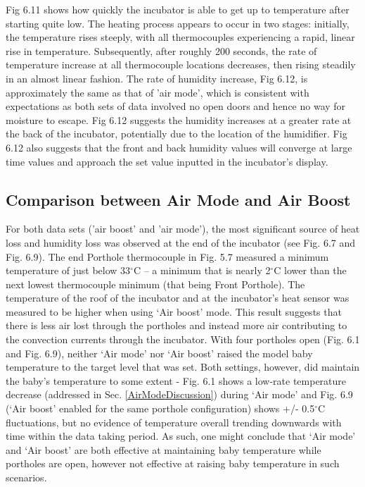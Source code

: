 \documentclass{article}
\begin{document}
  \vspace{3mm}

Fig 6.11 shows how quickly the incubator is able to get up to temperature after starting quite low. The heating process appears to occur in two stages: initially, the temperature rises steeply, with all thermocouples experiencing a rapid, linear rise in temperature. Subsequently, after roughly 200 seconds, the rate of temperature increase at all thermocouple locations decreases, then rising steadily in an almost linear fashion. The rate of humidity increase, Fig 6.12, is approximately the same as that of 'air mode', which is consistent with expectations as both sets of data involved no open doors and hence no way for moisture to escape. Fig 6.12 suggests the humidity increases at a greater rate at the back of the incubator, potentially due to the location of the humidifier. Fig 6.12 also suggests that the front and back humidity values will converge at large time values and approach the set value inputted in the incubator’s display. 


\subsection{Comparison between Air Mode and Air Boost} \label{ModeBoostComparison}

For both data sets ('air boost' and 'air mode'), the most significant source of heat loss and humidity loss was observed at the end of the incubator (see Fig. 6.7 and Fig. 6.9). The end Porthole thermocouple in Fig. 5.7 measured a minimum temperature of just below 33$^{\circ}$C – a minimum that is nearly 2$^{\circ}$C lower than the next lowest thermocouple minimum (that being Front Porthole). The temperature of the roof of the incubator and at the incubator’s heat sensor was measured to be higher when using ‘Air boost’ mode. This result suggests that there is less air lost through the portholes and instead more air contributing to the convection currents through the incubator. With four portholes open (Fig. 6.1 and Fig. 6.9), neither ‘Air mode’ nor ‘Air boost’ raised the model baby temperature to the target level that was set. Both settings, however, did maintain the baby’s temperature to some extent - Fig. 6.1 shows a low-rate temperature decrease (addressed in Sec. \ref{AirModeDiscussion}) during ‘Air mode’ and Fig. 6.9 (‘Air boost’ enabled for the same porthole configuration) shows +/- 0.5$^{\circ}$C fluctuations, but no evidence of temperature overall trending downwards with time within the data taking period. As such, one might conclude that ‘Air mode’ and ‘Air boost’ are both effective at maintaining baby temperature while portholes are open, however not effective at raising baby temperature in such scenarios. 
\end{document}
